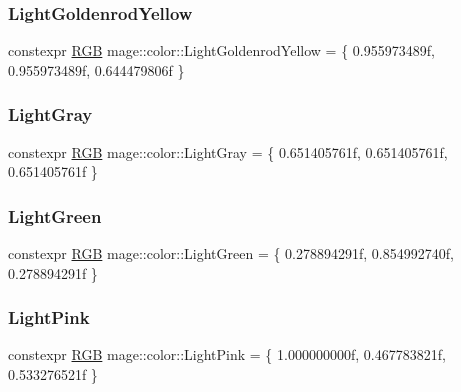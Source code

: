 \subsubsection{\texorpdfstring{Light\+Goldenrod\+Yellow}{LightGoldenrodYellow}}
{\footnotesize\ttfamily constexpr \hyperlink{structmage_1_1_r_g_b}{R\+GB} mage\+::color\+::\+Light\+Goldenrod\+Yellow = \{ 0.\+955973489f, 0.\+955973489f, 0.\+644479806f \}}

\hypertarget{namespacemage_1_1color_aadf052403392216e671d0ac1b18d1909}{}\label{namespacemage_1_1color_aadf052403392216e671d0ac1b18d1909} 
\subsubsection{\texorpdfstring{Light\+Gray}{LightGray}}
{\footnotesize\ttfamily constexpr \hyperlink{structmage_1_1_r_g_b}{R\+GB} mage\+::color\+::\+Light\+Gray = \{ 0.\+651405761f, 0.\+651405761f, 0.\+651405761f \}}

\hypertarget{namespacemage_1_1color_a8229e71bb1cae46b47e2c415ac4b43ea}{}\label{namespacemage_1_1color_a8229e71bb1cae46b47e2c415ac4b43ea} 
\subsubsection{\texorpdfstring{Light\+Green}{LightGreen}}
{\footnotesize\ttfamily constexpr \hyperlink{structmage_1_1_r_g_b}{R\+GB} mage\+::color\+::\+Light\+Green = \{ 0.\+278894291f, 0.\+854992740f, 0.\+278894291f \}}

\hypertarget{namespacemage_1_1color_a2211bc4700514d59df25b53387aa1d32}{}\label{namespacemage_1_1color_a2211bc4700514d59df25b53387aa1d32} 
\subsubsection{\texorpdfstring{Light\+Pink}{LightPink}}
{\footnotesize\ttfamily constexpr \hyperlink{structmage_1_1_r_g_b}{R\+GB} mage\+::color\+::\+Light\+Pink = \{ 1.\+000000000f, 0.\+467783821f, 0.\+533276521f \}}

\hypertarget{namespacemage_1_1color_a0ea813bec32974b56714ee519d3fd738}{}\label{namespacemage_1_1color_a0ea813bec32974b56714ee519d3fd738} 
